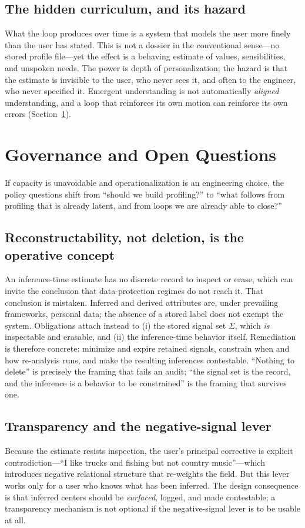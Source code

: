 \documentclass[conference]{IEEEtran}
\theoremstyle{definition}
\newcommand{\scaffold}{\Sigma}
\begin{document}
\subsection{The hidden curriculum, and its hazard}
What the loop produces over time is a system that models the user more finely than the user has stated. This is not a dossier in the conventional sense---no stored profile file---yet the effect is a behaving estimate of values, sensibilities, and unspoken needs. The power is depth of personalization; the hazard is that the estimate is invisible to the user, who never sees it, and often to the engineer, who never specified it. Emergent understanding is not automatically \emph{aligned} understanding, and a loop that reinforces its own motion can reinforce its own errors (Section~\ref{sec:governance}).

\section{Governance and Open Questions}
\label{sec:governance}

If capacity is unavoidable and operationalization is an engineering choice, the policy questions shift from ``should we build profiling?'' to ``what follows from profiling that is already latent, and from loops we are already able to close?''

\subsection{Reconstructability, not deletion, is the operative concept}
An inference-time estimate has no discrete record to inspect or erase, which can invite the conclusion that data-protection regimes do not reach it. That conclusion is mistaken. Inferred and derived attributes are, under prevailing frameworks, personal data; the absence of a stored label does not exempt the system. Obligations attach instead to (i) the stored signal set $\scaffold$, which \emph{is} inspectable and erasable, and (ii) the inference-time behavior itself. Remediation is therefore concrete: minimize and expire retained signals, constrain when and how re-analysis runs, and make the resulting inferences contestable. ``Nothing to delete'' is precisely the framing that fails an audit; ``the signal set is the record, and the inference is a behavior to be constrained'' is the framing that survives one.

\subsection{Transparency and the negative-signal lever}
Because the estimate resists inspection, the user's principal corrective is explicit contradiction---``I like trucks and fishing but not country music''---which introduces negative relational structure that re-weights the field. But this lever works only for a user who knows what has been inferred. The design consequence is that inferred centers should be \emph{surfaced}, logged, and made contestable; a transparency mechanism is not optional if the negative-signal lever is to be usable at all.
\end{document}
